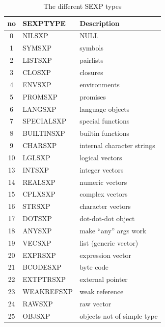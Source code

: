 \begin{table}[h!]
	\begin{tabular}{c l l}
		\textbf{no} & \textbf{SEXPTYPE} & \textbf{Description}       \\
		\hline
		0           & NILSXP            & NULL                       \\
		1           & SYMSXP            & symbols                    \\
		2           & LISTSXP           & pairlists                  \\
		3           & CLOSXP            & closures                   \\
		4           & ENVSXP            & environments               \\
		5           & PROMSXP           & promises                   \\
		6           & LANGSXP           & language objects           \\
		7           & SPECIALSXP        & special functions          \\
		8           & BUILTINSXP        & builtin functions          \\
		9           & CHARSXP           & internal character strings \\
		10          & LGLSXP            & logical vectors            \\
		13          & INTSXP            & integer vectors            \\
		14          & REALSXP           & numeric vectors            \\
		15          & CPLXSXP           & complex vectors            \\
		16          & STRSXP            & character vectors          \\
		17          & DOTSXP            & dot-dot-dot object         \\
		18          & ANYSXP            & make “any” args work       \\
		19          & VECSXP            & list (generic vector)      \\
		20          & EXPRSXP           & expression vector          \\
		21          & BCODESXP          & byte code                  \\
		22          & EXTPTRSXP         & external pointer           \\
		23          & WEAKREFSXP        & weak reference             \\
		24          & RAWSXP            & raw vector                 \\
		25          & OBJSXP            & objects not of simple type \\
	\end{tabular}
	\caption{The different SEXP types\cite[1.1.1 SEXPTYPEs]{rprojectInternals}}\label{tbl:sexptype}
\end{table}

